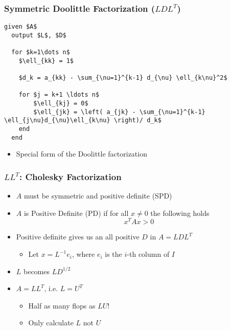 \documentclass[10pt]{beamer}
\begin{document}
\begin{frame}[fragile]
\frametitle{Symmetric Doolittle Factorization ($LDL^T$)}

\begin{lstlisting}[mathescape,caption=Symm Doolittle,label=algo:symmdoolittle]
  given $A$
  output $L$, $D$
                               
  for $k=1\dots n$          
    $\ell_{kk} = 1$

    $d_k = a_{kk} - \sum_{\nu=1}^{k-1} d_{\nu} \ell_{k\nu}^2$

    for $j = k+1 \ldots n$      
        $\ell_{kj} = 0$
        $\ell_{jk} = \left( a_{jk} - \sum_{\nu=1}^{k-1}
\ell_{j\nu}d_{\nu}\ell_{k\nu} \right)/ d_k$
    end
  end                          
\end{lstlisting}
\begin{itemize}
    \item Special form of the Doolittle factorization
\end{itemize}
\end{frame}
\begin{frame}
\frametitle{$LL^T$: Cholesky Factorization}

\begin{itemize}
    \item $A$ must be symmetric and positive definite (SPD)
    \item $A$ is Positive Definite (PD) if for all $x \ne 0$ the following holds
          \[ x^T A x > 0 \]
    \item Positive definite gives us an all positive $D$ in $A = L D L^T$
    \begin{itemize}
        \item Let $x = L^{-1} e_i$, where $e_i$ is the $i$-th column of $I$
    \end{itemize}
    \item $L$ becomes $L D^{1/2}$ 
    \item $A = L L^T$, i.e. $L = U^T$
    \begin{itemize}
        \item Half as many flops as $LU$!
        \item Only calculate $L$ not $U$
    \end{itemize}
\end{itemize}
\end{frame}
\end{document}

